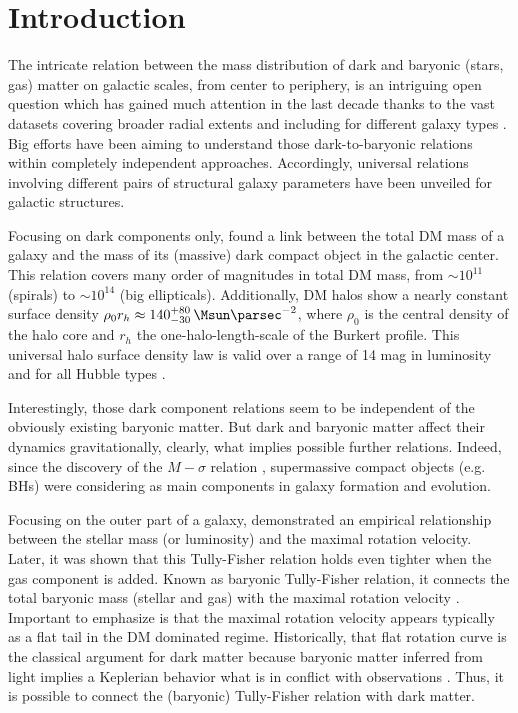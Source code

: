 \section{Introduction}
The intricate relation between the mass distribution of dark and baryonic (stars, gas) matter on galactic scales, from center to periphery, is an intriguing open question which has gained much attention in the last decade thanks to the vast datasets covering broader radial extents and including for different galaxy types \citep{2008AJ....136.2648D,2016AJ....152..157L,2011MNRAS.413..813C}. Big efforts have been aiming to understand those dark-to-baryonic relations within completely independent approaches. Accordingly, universal relations involving different pairs of structural galaxy parameters have been unveiled for galactic structures.

Focusing on dark components only, \citet{2002ApJ...578...90F} found a link between the total DM mass of a galaxy and the mass of its (massive) dark compact object in the galactic center. This relation covers many order of magnitudes in total DM mass, from $\sim 10^{11}$ (spirals) to $\sim 10^{14}$ (big ellipticals). Additionally, DM halos show a nearly constant surface density $\rho_0 r_h \approx 140^{+80}_{-30}\,\si{\Msun\parsec^{-2}}$, where $\rho_0$ is the central density of the halo core and $r_h$ the one-halo-length-scale of the Burkert profile. This universal halo surface density law is valid over a range of 14 mag in luminosity and for all Hubble types \citep{2009MNRAS.397.1169D}.

Interestingly, those dark component relations seem to be independent of the obviously existing baryonic matter. But dark and baryonic matter affect their dynamics gravitationally, clearly, what implies possible further relations. Indeed, since the discovery of the $M-\sigma$ relation \citep{2000ApJ...539L...9F}, supermassive compact objects (e.g. BHs) were considering as main components in galaxy formation and evolution.

Focusing on the outer part of a galaxy, \citet{1977A&A....54..661T} demonstrated an empirical relationship between the stellar mass (or luminosity) and the maximal rotation velocity. Later, it was shown that this Tully-Fisher relation holds even tighter when the gas component is added. Known as baryonic Tully-Fisher relation, it connects the total baryonic mass (stellar and gas) with the maximal rotation velocity \citep{2000ApJ...533L..99M}. Important to emphasize is that the maximal rotation velocity appears typically as a flat tail in the DM dominated regime. Historically, that flat rotation curve is the classical argument for dark matter because baryonic matter inferred from light implies a Keplerian behavior what is in conflict with observations \citep{1980ApJ...238..471R}. Thus, it is possible to connect the (baryonic) Tully-Fisher relation with dark matter.

